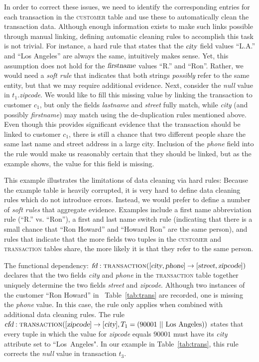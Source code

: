 
In order to correct these issues, we need to identify the corresponding entries for each transaction in the \textsc{customer} table and use these to automatically clean the transaction data. Although enough information exists to make such links possible through manual linking, defining automatic cleaning rules to accomplish this task is not trivial. For instance, a hard rule that states that the $\textsl{city}$ field values ``L.A.'' and ``Los Angeles'' are always the same, intuitively makes sense. Yet, this assumption does not hold for the $\textsl{firstname}$ values ``R.'' and ``Ron''. Rather, we would need a \emph{soft rule} that indicates that both strings \emph{possibly} refer to the same entity, but that we may require additional evidence. Next, consider the \emph{null} value in $t_1.$\textsl{zipcode}. We would like to fill this missing value by linking the transaction to customer $c_1$, but only the fields \textsl{lastname} and \textsl{street} fully match, while \textsl{city} (and possibly \textsl{firstname}) may match using the de-duplication rules mentioned above. Even though this provides significant evidence that the transaction should be linked to customer $c_1$, there is still a chance that two different people share the same last name and street address in a large city. Inclusion of the \textsl{phone} field into the rule would make us reasonably certain that they should be linked, but as the example shows, the value for this field is missing. 

This example illustrates the limitations of data cleaning via hard rules: Because the example table is heavily corrupted, it is very hard to define data cleaning rules which do not introduce errors. Instead, we would prefer to define a number of \emph{soft rules} that aggregate evidence. Examples include a first name abbreviation rule (``R.'' vs. ``Ron''), a first and last name switch rule (indicating that there is a small chance that ``Ron Howard'' and ``Howard Ron'' are the same person), and rules that indicate that the more fields two tuples in the \textsc{customer} and \textsc{transaction} tables share, the more likely it is that they refer to the same person. 

The functional dependency: $\textsl{fd}: \textsc{transaction}([\textsl{city}, \textsl{phone}] \rightarrow [\textsl{street}, \textsl{zipcode}])$ declares that the two fields \textsl{city} and \textsl{phone} in the \textsc{transaction} table together uniquely determine the two fields \textsl{street} and \textsl{zipcode}. Although two instances of the customer ``Ron Howard'' in ~Table~\ref{tab:trans} are recorded, one is missing the \textsl{phone} value. In this case, the rule only applies when combined with additional data cleaning rules. The rule $\textsl{cfd}: \textsc{transaction}([\textsl{zipcode}] \rightarrow [\textsl{city}], T_1 =(90001~||~\text{Los~Angeles}))$ states that every tuple in which the value for \textsl{zipcode} equals $90001$ must have its \textsl{city} attribute set to ``Los~Angeles". In our example in Table~\ref{tab:trans}, this rule corrects the \emph{null} value in transaction $t_3$. 

